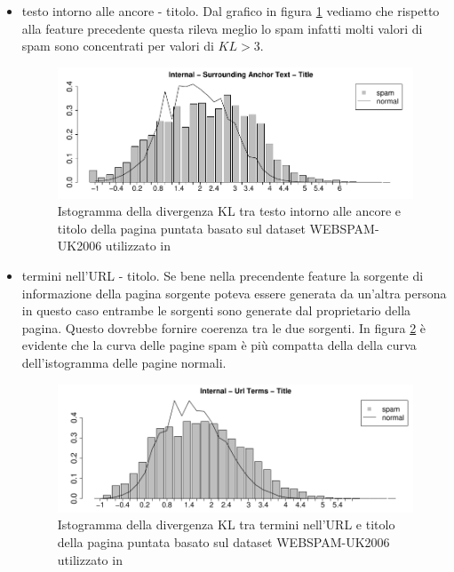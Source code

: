 \begin{itemize}
\item testo intorno alle ancore - titolo. Dal grafico in figura \ref{fig:martinez5} vediamo che rispetto alla feature precedente questa rileva meglio lo spam infatti molti valori di spam sono concentrati per valori di \(KL > 3\).
\begin{figure}[htbp]
\centering
\includegraphics[width=12cm]{immagini/martinez/martinez5}
\caption{Istogramma della divergenza KL tra testo intorno alle ancore e titolo della pagina puntata basato sul dataset WEBSPAM-UK2006 utilizzato in \cite{Martinez-Romo:2009:WSI:1531914.1531920}}
\label{fig:martinez5}
\end{figure}

\item termini nell'URL - titolo. Se bene nella precendente feature la sorgente di informazione della pagina sorgente poteva essere generata da un'altra persona in questo caso entrambe le sorgenti sono generate dal proprietario della pagina. Questo dovrebbe fornire coerenza tra le due sorgenti. In figura \ref{fig:martinez6} è evidente che la curva delle pagine spam è più compatta della della curva dell'istogramma delle pagine normali.
\begin{figure}[htbp]
\centering
\includegraphics[width=12cm]{immagini/martinez/martinez6}
\caption{Istogramma della divergenza KL tra termini nell'URL e titolo della pagina puntata basato sul dataset WEBSPAM-UK2006 utilizzato in \cite{Martinez-Romo:2009:WSI:1531914.1531920}}
\label{fig:martinez6}
\end{figure}


\end{itemize}
